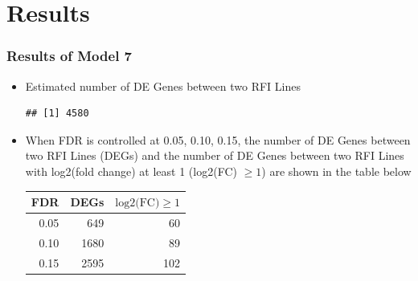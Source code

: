 \documentclass[handout,xcolor=pdftex,dvipsnames,table]{beamer}\usepackage[]{graphicx}\usepackage[]{color}
\makeatletter
\newenvironment{kframe}{%
 \def\at@end@of@kframe{}%
 \ifinner\ifhmode%
  \def\at@end@of@kframe{\end{minipage}}%
  \begin{minipage}{\columnwidth}%
 \fi\fi%
 \def\FrameCommand##1{\hskip\@totalleftmargin \hskip-\fboxsep
 \colorbox{shadecolor}{##1}\hskip-\fboxsep
     \hskip-\linewidth \hskip-\@totalleftmargin \hskip\columnwidth}%
 \MakeFramed {\advance\hsize-\width
   \@totalleftmargin\z@ \linewidth\hsize
   \@setminipage}}%
 {\par\unskip\endMakeFramed%
 \at@end@of@kframe}
\newenvironment{knitrout}{}{} %
\makeatother
\begin{document}
\section{Results}
\begin{frame}[fragile]
\frametitle{Results of Model 7}
\begin{itemize}
\item 
Estimated number of DE Genes between two RFI Lines
\begin{knitrout}\footnotesize
{}\color{fgcolor}\begin{kframe}
\begin{verbatim}
## [1] 4580
\end{verbatim}
\end{kframe}
\end{knitrout}


\item When FDR is controlled at 0.05, 0.10, 0.15, the number of DE Genes between two RFI Lines (DEGs) and the number of DE Genes between two RFI Lines with log2(fold change) at least 1 (log2(FC) $\geq 1$) are shown in the table below
\begin{table}[ht]
\centering
\begin{tabular}{rrr}
  \hline
FDR & DEGs & $\mbox{log2(FC)}\geq 1$ \\ 
  \hline
0.05 & 649 &  60 \\ 
  0.10 & 1680 &  89 \\ 
  0.15 & 2595 & 102 \\ 
   \hline
\end{tabular}
\end{table}


\end{itemize}
\end{frame}
\end{document}
